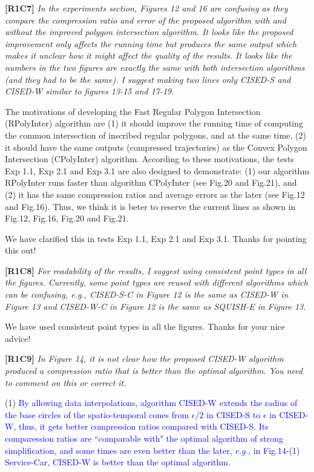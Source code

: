 \documentclass{letter}
\newcommand{\eg}{\emph{e.g.,}\xspace}
\begin{document}
{\textbf{[R1C7]} \emph{In the experiments section, Figures 12 and 16 are confusing as they compare the compression ratio and error of the proposed algorithm with and without the improved polygon intersection algorithm. It looks like the proposed improvement only affects the running time but produces the same output which makes it unclear how it might affect the quality of the results. It looks like the numbers in the two figures are exactly the same with both intersection algorithms (and they had to be the same). I suggest making two lines only CISED-S and CISED-W similar to figures 13-15 and 17-19.}

The motivations of developing the Fast Regular Polygon Intersection (RPolyInter) algorithm are (1) it should improve the running time of computing the common intersection of inscribed regular polygons, and at the same time, (2) it should have the same outputs (compressed trajectories) as the Convex Polygon Intersection (CPolyInter) algorithm.
%
According to these motivations, the tests Exp 1.1, Exp 2.1 and Exp 3.1 are also designed to demonstrate: (1) our algorithm RPolyInter runs faster than algorithm CPolyInter (see Fig.20 and Fig.21), and (2) it has the same compression ratios and average errors as the later (see Fig.12 and Fig.16).
%
Thus, we think it is beter to reserve the current lines as shown in Fig.12, Fig.16, Fig.20 and Fig.21. %

We have clarified this in tests Exp 1.1, Exp 2.1 and Exp 3.1. Thanks for pointing this out!

\textbf{[R1C8]} \emph{For readability of the results, I suggest using consistent point types in all the figures. Currently, some point types are reused with different algorithms which can be confusing, e.g., CISED-S-C in Figure 12 is the same as CISED-W in Figure 13 and CISED-W-C in Figure 12 is the same as SQUISH-E in Figure 13.}

We have used consistent point types in all the figures. Thanks for your nice advice!

\textbf{[R1C9]} \emph{In Figure 14, it is not clear how the proposed CISED-W algorithm produced a compression ratio that is better than the optimal algorithm. You need to comment on this or correct it.}

(1) \textcolor{blue}{By allowing data interpolations, algorithm CISED-W extends the radius of the base circles of the spatio-temporal cones from $\epsilon/2$ in CISED-S to $\epsilon$ in CISED-W, thus, it gets better compression ratios compared with CISED-S. Its comparession ratios are ``comparable with" the optimal algorithm of strong simplification, and some times are even better than the later, \eg in Fig.14-(1) Service-Car, CISED-W is better than the optimal algorithm. }

}
\end{document}
